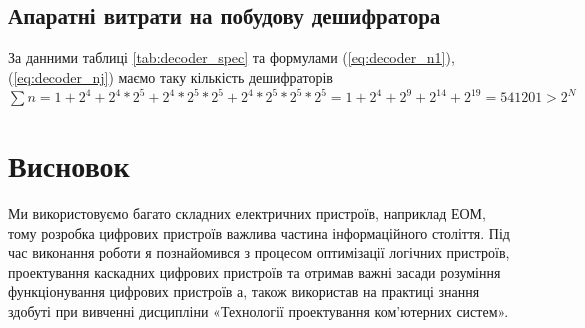 \section{Апаратні витрати на побудову дешифратора}
За данними таблиці \ref{tab:decoder_spec} та формулами (\ref{eq:decoder_n1}),(\ref{eq:decoder_nj}) маємо таку кількість дешифраторів $\sum n=1+2^{4}+2^{4}*2^{5}+2^{4}*2^{5}*2^{5}+2^{4}*2^{5}*2^{5}*2^{5}=1+2^{4}+2^{9}+2^{14}+2^{19}=541201>2^{N}$
\newpage
\chapter{Висновок}
Ми використовуємо багато складних електричних пристроїв, наприклад ЕОМ, тому розробка цифрових пристроїв важлива частина інформаційного століття. Під час виконання роботи я познайомився з процесом оптимізації логічних пристроїв, проектування каскадних цифрових пристроїв та отримав важні засади розуміння функціонування цифрових пристроїв а, також використав на практиці знання здобуті при вивченні дисципліни «Технології проектування ком'ютерних систем».